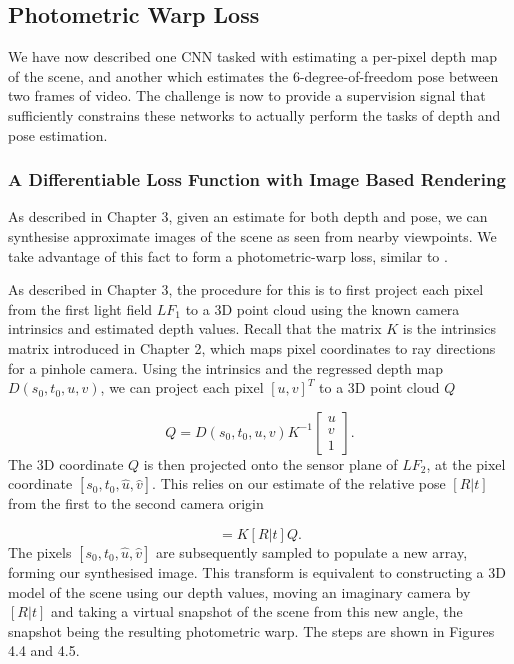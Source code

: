 \subsection{Photometric Warp Loss}
We have now described one CNN tasked with estimating a per-pixel depth map of the scene, and another which estimates the 6-degree-of-freedom pose between two frames of video. The challenge is now to provide a supervision signal that sufficiently constrains these networks to actually perform the tasks of depth and pose estimation. 

\subsubsection{A Differentiable Loss Function with Image Based Rendering}

As described in Chapter 3, given an estimate for both depth and pose, we can synthesise approximate images of the scene as seen from nearby viewpoints. We take advantage of this fact to form a photometric-warp loss, similar to \cite{zhou2017unsupervised}. 

As described in Chapter 3, the procedure for this is to first project each pixel from the first light field $LF_1$ to a 3D point cloud using the known camera intrinsics and estimated depth values. Recall that the matrix $K$ is the intrinsics matrix introduced in Chapter 2, which maps pixel coordinates to ray directions for a pinhole camera. Using the intrinsics and the regressed depth map $D(s_0, t_0, u, v)$, we can project each pixel $[u, v]^T$ to a 3D point cloud $Q$

\begin{equation}
    Q = D(s_0, t_0, u, v) K^{-1}\begin{bmatrix}u \\ v \\ 1\end{bmatrix}.
\end{equation}
 The 3D coordinate $Q$ is then projected onto the sensor plane of $LF_2$, at the pixel coordinate $[s_0,t_0,\hat{u},\hat{v}]$. This relies on our estimate of the relative pose $[R|t]$ from the first to the second camera origin

\begin{equation}
    [s_0, t_0, \hat{u}, \hat{v}] = K[R|t]Q. 
\end{equation}
The pixels $[s_0, t_0, \hat{u}, \hat{v}]$ are subsequently sampled to populate a new array, forming our synthesised image. This transform is equivalent to constructing a 3D model of the scene using our depth values, moving an imaginary camera by $[R|t]$ and taking a virtual snapshot of the scene from this new angle, the snapshot being the resulting photometric warp. The steps are shown in Figures 4.4 and 4.5.\\

